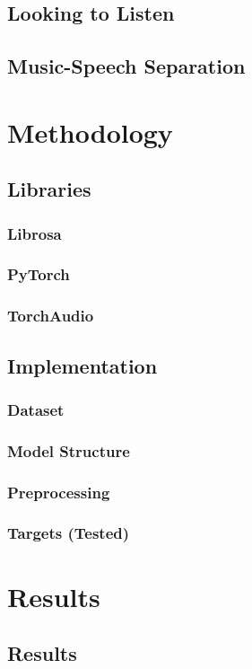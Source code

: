 \documentclass{book}
\begin{document}
\chapter{Looking to Listen}
\chapter{Music-Speech Separation}

\part{Methodology}
\chapter{Libraries}
\section{Librosa}
\section{PyTorch}
\section{TorchAudio}
\chapter{Implementation}
\section{Dataset}
\section{Model Structure}
\section{Preprocessing}
\section{Targets (Tested)}


\part{Results}
\chapter{Results}
\end{document}
